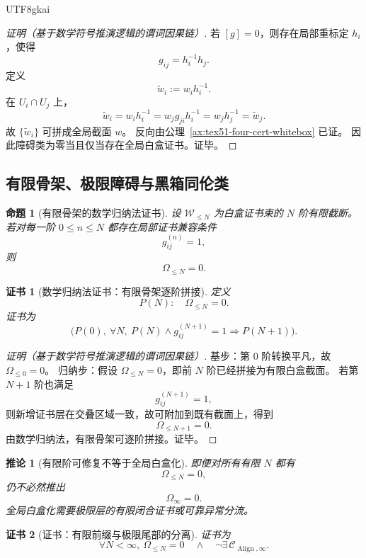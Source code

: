 \documentclass[12pt]{article}
\newtheorem{proposition}{命题}[section]
\newtheorem{corollary}{推论}[section]
\newtheorem{Certificate}{证书}[section]
\newcommand{\Align}{\operatorname{Align}}
\begin{document}
\begin{CJK*}{UTF8}{gkai}
\begin{proof}[证明（基于数学符号推演逻辑的谓词因果链）]
若 \([g]=0\)，则存在局部重标定 \(h_i\)，使得
\[
  g_{ij}=h_i^{-1}h_j.
\]
定义
\[
  \widetilde w_i:=w_i h_i^{-1}.
\]
在 \(U_i\cap U_j\) 上，
\[
  \widetilde w_i
  =
  w_i h_i^{-1}
  =
  w_j g_{ji} h_i^{-1}
  =
  w_j h_j^{-1}
  =
  \widetilde w_j.
\]
故 \(\{\widetilde w_i\}\) 可拼成全局截面 \(w\)。
反向由公理~\ref{ax:tex51-four-cert-whitebox} 已证。
因此障碍类为零当且仅当存在全局白盒证书。证毕。
\end{proof}

\subsection{有限骨架、极限障碍与黑箱同伦类}
\label{subsec:tex51-finite-skeleton-blackbox}

\begin{proposition}[有限骨架的数学归纳法证书]
\label{prop:tex51-finite-skeleton}
设 \(\mathcal W_{\le N}\) 为白盒证书束的 \(N\) 阶有限截断。
若对每一阶 \(0\le n\le N\) 都存在局部证书兼容条件
\[
  g_{ij}^{(n)}=1,
\]
则
\[
  \Omega_{\le N}=0.
\]
\end{proposition}

\begin{Certificate}[数学归纳法证书：有限骨架逐阶拼接]
\label{cert:tex51-finite-skeleton}
定义
\[
  P(N):\quad \Omega_{\le N}=0.
\]
证书为
\[
  \bigl(P(0),\ \forall N,\ P(N)\wedge g_{ij}^{(N+1)}=1\Rightarrow P(N+1)\bigr).
\]
\end{Certificate}

\begin{proof}[证明（基于数学符号推演逻辑的谓词因果链）]
基步：第 \(0\) 阶转换平凡，故 \(\Omega_{\le 0}=0\)。
归纳步：假设 \(\Omega_{\le N}=0\)，即前 \(N\) 阶已经拼接为有限白盒截面。
若第 \(N+1\) 阶也满足
\[
  g_{ij}^{(N+1)}=1,
\]
则新增证书层在交叠区域一致，故可附加到既有截面上，得到
\[
  \Omega_{\le N+1}=0.
\]
由数学归纳法，有限骨架可逐阶拼接。证毕。
\end{proof}

\begin{corollary}[有限阶可修复不等于全局白盒化]
\label{cor:tex51-finite-not-global-whitebox}
即便对所有有限 \(N\) 都有
\[
  \Omega_{\le N}=0,
\]
仍不必然推出
\[
  \Omega_\infty=0.
\]
全局白盒化需要极限层的有限闭合证书或可靠异常分流。
\end{corollary}

\begin{Certificate}[证书：有限前缀与极限尾部的分离]
\label{cert:tex51-finite-not-global-whitebox}
证书为
\[
  \forall N<\infty,\ \Omega_{\le N}=0
  \quad\wedge\quad
  \neg\exists\,\mathcal C_{\Align,\infty}.
\]
\end{Certificate}


\end{CJK*}
\end{document}
